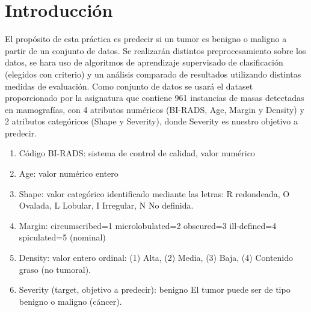 \documentclass[12pt,twoside]{report}
\date{Curso 2020-2021}
\begin{document}



\clearpage{\pagestyle{empty}\cleardoublepage}
\setcounter{page}{1}
\pagestyle{fancy}


\clearpage{\pagestyle{empty}\cleardoublepage}

\begingroup
\pagestyle{plain}
\tableofcontents 
\listoffigures
\listoftables
\endgroup

\clearpage{\pagestyle{empty}\cleardoublepage}
\setcounter{page}{1}
\fancyhead[LE,RO]{\slshape \rightmark}
\fancyhead[LO,RE]{\slshape \leftmark}

\chapter*{Introducción}

El propósito de esta práctica es predecir si  un tumor es benigno o maligno a partir de un conjunto de datos. Se realizarán distintos preprocesamiento sobre los datos, se hara uso de algoritmos de aprendizaje supervisado de clasificación (elegidos con criterio) y un análisis comparado de resultados utilizando distintas medidas de evaluación. Como conjunto de datos se usará el dataset proporcionado por la asignatura que contiene 961 instancias de masas detectadas en mamografías, con 4 atributos numéricos (BI-RADS, Age, Margin y Density) y 2 atributos categóricos (Shape y Severity), donde Severity es nuestro objetivo a predecir.

\begin{enumerate}
	\item Código BI-RADS: sistema de control de calidad, valor numérico 
	\item Age: valor numérico entero
	\item Shape: valor categórico identificado mediante las letras: R redondeada, O Ovalada, L Lobular, I Irregular, N No definida.
	\item Margin: circumscribed=1 microlobulated=2 obscured=3 ill-defined=4 spiculated=5 (nominal)
	\item Density: valor entero ordinal: (1) Alta, (2) Media, (3) Baja, (4) Contenido graso (no tumoral).	
	\item Severity (target, objetivo a predecir): benigno El tumor puede ser de tipo benigno o maligno (cáncer).

\end{enumerate}
\end{document}
